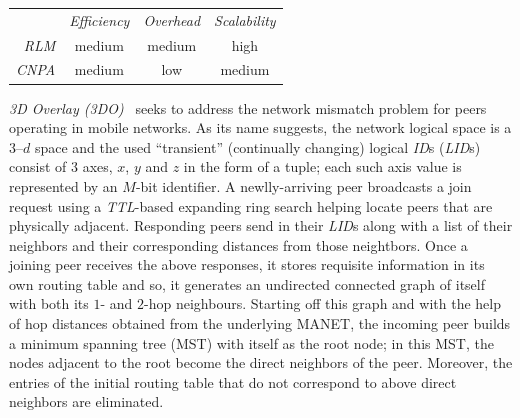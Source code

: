 \begin{center}
{\footnotesize
\begin{tabular}{rccc}
\multicolumn{1}{r}{} &
\multicolumn{1}{c}{\emph{Efficiency}} &
\multicolumn{1}{c}{\emph{Overhead}} &
\multicolumn{1}{c}{\emph{Scalability}}
\\
\cline{2-4}
\emph{RLM} &
medium &
%
medium &
high \\
\emph{CNPA} &
%
medium &
low &
medium \\
\end{tabular}
}
\end{center}

\emph{3D Overlay (3DO)}~\cite{AOS2014} seeks to address the 
network mismatch problem  for peers operating in mobile networks.
As its name suggests, the network logical space is 
a $3$--$d$ space and the used ``transient'' (continually changing) 
logical \emph{ID}s (\emph{LID}s) consist of $3$ axes, $x$, $y$ and $z$ 
in the form of a tuple;
each such axis value is represented by an $M$-bit identifier.
A newlly-arriving peer broadcasts a join request using
a \emph{TTL}-based expanding ring search helping locate 
peers that are physically adjacent.
Responding peers send in 
their \emph{LID}s along with a list of their neighbors 
and their corresponding distances from those neightbors. 
Once a joining peer receives the above responses,
it stores requisite information in its own routing table 
and so, it generates an undirected connected
graph of itself with both its $1$- and $2$-hop neighbours. 
Starting off this graph and with the help of hop 
distances obtained from the underlying MANET,
the incoming peer builds a minimum spanning tree (MST)
with itself as the root node; 
in this MST, the nodes adjacent to the root become the
direct neighbors of the peer.
Moreover, the entries of the initial routing table 
that do not correspond to above direct neighbors are
eliminated.

